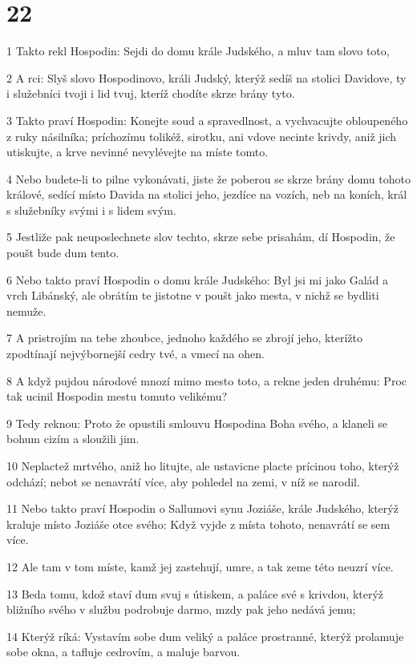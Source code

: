 \chapter{22}

\par 1 Takto rekl Hospodin: Sejdi do domu krále Judského, a mluv tam slovo toto,
\par 2 A rci: Slyš slovo Hospodinovo, králi Judský, kterýž sedíš na stolici Davidove, ty i služebníci tvoji i lid tvuj, kteríž chodíte skrze brány tyto.
\par 3 Takto praví Hospodin: Konejte soud a spravedlnost, a vychvacujte obloupeného z ruky násilníka; príchozímu tolikéž, sirotku, ani vdove necinte krivdy, aniž jich utiskujte, a krve nevinné nevylévejte na míste tomto.
\par 4 Nebo budete-li to pilne vykonávati, jiste že poberou se skrze brány domu tohoto králové, sedící místo Davida na stolici jeho, jezdíce na vozích, neb na koních, král s služebníky svými i s lidem svým.
\par 5 Jestliže pak neuposlechnete slov techto, skrze sebe prisahám, dí Hospodin, že poušt bude dum tento.
\par 6 Nebo takto praví Hospodin o domu krále Judského: Byl jsi mi jako Galád a vrch Libánský, ale obrátím te jistotne v poušt jako mesta, v nichž se bydliti nemuže.
\par 7 A pristrojím na tebe zhoubce, jednoho každého se zbrojí jeho, kterížto zpodtínají nejvýbornejší cedry tvé, a vmecí na ohen.
\par 8 A když pujdou národové mnozí mimo mesto toto, a rekne jeden druhému: Proc tak ucinil Hospodin mestu tomuto velikému?
\par 9 Tedy reknou: Proto že opustili smlouvu Hospodina Boha svého, a klaneli se bohum cizím a sloužili jim.
\par 10 Neplactež mrtvého, aniž ho litujte, ale ustavicne placte prícinou toho, kterýž odchází; nebot se nenavrátí více, aby pohledel na zemi, v níž se narodil.
\par 11 Nebo takto praví Hospodin o Sallumovi synu Joziáše, krále Judského, kterýž kraluje místo Joziáše otce svého: Když vyjde z místa tohoto, nenavrátí se sem více.
\par 12 Ale tam v tom míste, kamž jej zastehují, umre, a tak zeme této neuzrí více.
\par 13 Beda tomu, kdož staví dum svuj s útiskem, a paláce své s krivdou, kterýž bližního svého v službu podrobuje darmo, mzdy pak jeho nedává jemu;
\par 14 Kterýž ríká: Vystavím sobe dum veliký a paláce prostranné, kterýž prolamuje sobe okna, a tafluje cedrovím, a maluje barvou.
